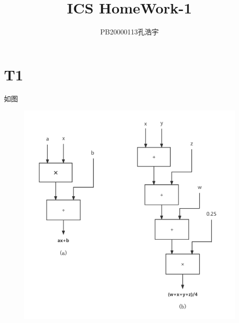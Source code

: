 \documentclass{article}
\title{ICS  HomeWork-1}
\author{PB20000113孔浩宇}
\begin{document}
\maketitle
\section*{T1}如图
\begin{figure}[h]
    \centering
    \includegraphics[scale=0.2]{01.png}
\end{figure}
\clearpage
\end{document}
